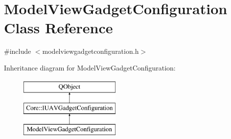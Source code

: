 \hypertarget{class_model_view_gadget_configuration}{\section{Model\-View\-Gadget\-Configuration Class Reference}
\label{class_model_view_gadget_configuration}
}


{\ttfamily \#include $<$modelviewgadgetconfiguration.\-h$>$}

Inheritance diagram for Model\-View\-Gadget\-Configuration\-:\begin{figure}[H]
\begin{center}
\leavevmode
\includegraphics[height=3.000000cm]{class_model_view_gadget_configuration}
\end{center}
\end{figure}
